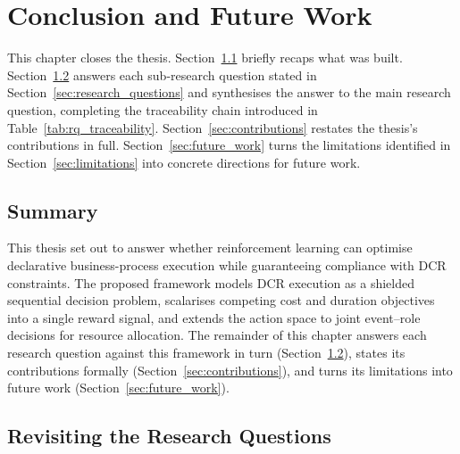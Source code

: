 
\chapter{Conclusion and Future Work}
\label{chap:conclusion}

This chapter closes the thesis. Section~\ref{sec:conclusion_summary} briefly recaps what was built. Section~\ref{sec:eq_revisited} answers each sub-research question stated in Section~\ref{sec:research_questions} and synthesises the answer to the main research question, completing the traceability chain introduced in Table~\ref{tab:rq_traceability}. Section~\ref{sec:contributions} restates the thesis's contributions in full. Section~\ref{sec:future_work} turns the limitations identified in Section~\ref{sec:limitations} into concrete directions for future work.

\section{Summary}
\label{sec:conclusion_summary}

This thesis set out to answer whether reinforcement learning can optimise declarative business-process execution while guaranteeing compliance with \ac{DCR} constraints. The proposed framework models \ac{DCR} execution as a shielded sequential decision problem, scalarises competing cost and duration objectives into a single reward signal, and extends the action space to joint event--role decisions for resource allocation. The remainder of this chapter answers each research question against this framework in turn (Section~\ref{sec:eq_revisited}), states its contributions formally (Section~\ref{sec:contributions}), and turns its limitations into future work (Section~\ref{sec:future_work}).

\section{Revisiting the Research Questions}
\label{sec:eq_revisited}

